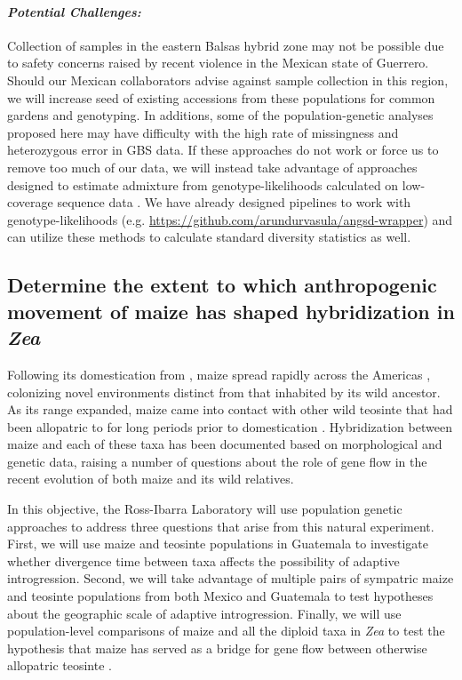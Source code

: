 \paragraph{\emph{Potential Challenges:}}
Collection of samples in the eastern Balsas hybrid zone may not be possible due to safety concerns raised by recent violence in the Mexican state of Guerrero.
Should our Mexican collaborators advise against sample collection in this region, we will increase seed of existing accessions from these populations for common gardens and genotyping.
In additions, some of the population-genetic analyses proposed here may have difficulty with the high rate of missingness and heterozygous error in GBS data.
If these approaches do not work or force us to remove too much of our data, we will instead take advantage of approaches designed  to estimate admixture from genotype-likelihoods calculated on low-coverage sequence data \citep{skotte2013estimating}. 
We have already designed pipelines to work with genotype-likelihoods (e.g. \url{https://github.com/arundurvasula/angsd-wrapper}) and can utilize these methods to calculate standard diversity statistics as well.  

\subsection{Determine the extent to which anthropogenic movement of maize has shaped hybridization in \emph{Zea} } 
\label{ss:genuswide}
Following its domestication from \zp{}, maize spread rapidly across the Americas \citep{Piperno2001,Grobman2012}, colonizing novel environments distinct from that inhabited by its wild ancestor. 
As its range expanded, maize came into contact with other wild teosinte that had been allopatric to \zp{} for long periods prior to domestication \citep{hufford2012inferences}.  
Hybridization between maize and each of these taxa has been documented based on morphological \citep{wilkes1967teosinte, Wilkes1977} and genetic \citep{doebley1990molecular,Fukunaga2005,Ross-Ibarra2009a,vanheerwaarden2011a} data, raising a number of questions about the role of gene flow in the recent evolution of both maize and its wild relatives.

In this objective, the Ross-Ibarra Laboratory will use population genetic approaches to address three questions that arise from this natural experiment.  
First, we will use maize and teosinte populations in Guatemala to investigate whether divergence time between taxa affects the possibility of adaptive introgression. 
Second, we will take advantage of multiple pairs of sympatric maize and teosinte populations from both Mexico and Guatemala to test hypotheses about the geographic scale of adaptive introgression.
Finally, we will use population-level comparisons of maize and all the diploid taxa in \emph{Zea} to test the hypothesis that maize has served as a bridge for gene flow between otherwise allopatric teosinte \citep{Ross-Ibarra2009a}.



